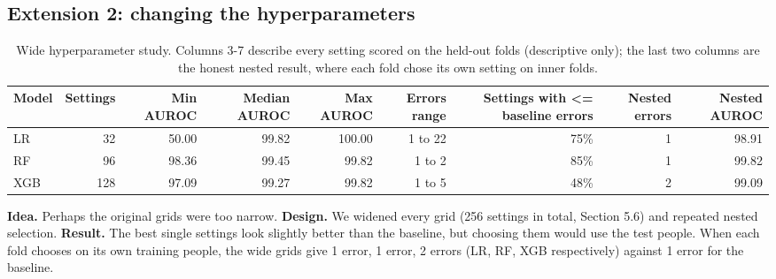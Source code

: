 \documentclass[11pt,a4paper]{article}
\begin{document}
\subsection{Extension 2: changing the hyperparameters}\label{sec:ext2}
\begin{table}[H]\centering\scriptsize\renewcommand{\arraystretch}{1.15}
\caption{Wide hyperparameter study. Columns 3-7 describe every setting scored on the held-out folds (descriptive only); the last two columns are the honest nested result, where each fold chose its own setting on inner folds.}
\begin{adjustbox}{max width=\linewidth}\begin{tabular}{lrrrrrrrr}
\toprule
\textbf{Model} & \textbf{Settings} & \textbf{Min AUROC} & \textbf{Median AUROC} & \textbf{Max AUROC} & \textbf{Errors range} & \textbf{Settings with <= baseline errors} & \textbf{Nested errors} & \textbf{Nested AUROC}\\
\midrule
LR & 32 & 50.00 & 99.82 & 100.00 & 1 to 22 & 75\% & 1 & 98.91\\
RF & 96 & 98.36 & 99.45 & 99.82 & 1 to 2 & 85\% & 1 & 99.82\\
XGB & 128 & 97.09 & 99.27 & 99.82 & 1 to 5 & 48\% & 2 & 99.09\\
\bottomrule
\end{tabular}\end{adjustbox}\end{table}
\textbf{Idea.} Perhaps the original grids were too narrow. \textbf{Design.} We widened every grid (256 settings in total, Section 5.6) and repeated nested selection. \textbf{Result.} The best single settings look slightly better than the baseline, but choosing them would use the test people. When each fold chooses on its own training people, the wide grids give 1 error, 1 error, 2 errors (LR, RF, XGB respectively) against 1 error for the baseline.
\end{document}
